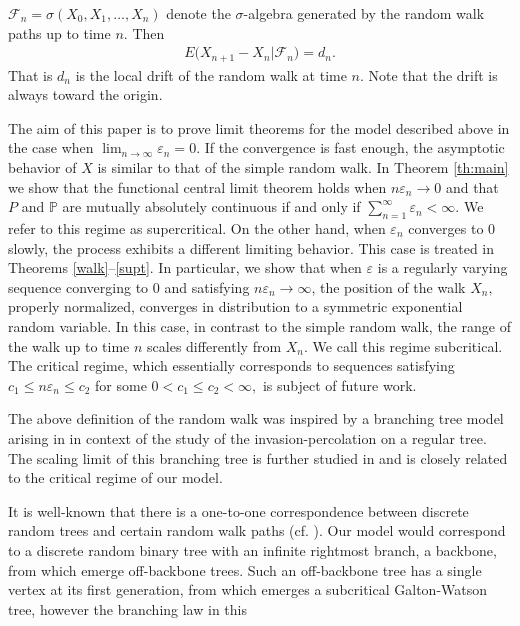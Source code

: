 \documentclass[12pt]{amsart}
\begin{document}
${{\mathcal F}}_n=\sigma(X_0,X_1,\dots,X_n)$ denote the $\sigma$-algebra
generated by the random walk paths up to time $n$. Then \begin{eqnarray}
\label{din_dyn} E \bigl( X_{n+1}-X_n | {{\mathcal F}}_n \bigr) = d_n. \end{eqnarray}
That is $d_n$ is the local drift of the random walk at time $n.$
Note that the drift is always toward the origin.
\par
The aim of this paper is to prove limit theorems for the model
described above in the case when $\lim_{n\to\infty}{\varepsilon}_n=0$. If
the convergence is fast enough, the asymptotic behavior of $X$ is
similar to that of the simple random walk. In Theorem \ref{th:main}
we show that the functional central limit theorem holds when $n
{\varepsilon}_n \to 0$ and that $P$ and ${{\mathbb P}}$ are mutually absolutely
continuous if and only if $\sum_{n=1}^{\infty} {\varepsilon}_n <\infty$. We
refer to this regime as supercritical. On the other hand, when
${\varepsilon}_n$ converges to $0$ slowly, the process exhibits a different
limiting behavior. This case is treated in Theorems
\ref{walk}--\ref{supt}. In particular, we show that when ${\varepsilon}$ is
a regularly varying sequence converging to $0$ and satisfying $n
{\varepsilon}_n \to\infty$, the position of the walk $X_n,$ properly
normalized, converges in distribution to a symmetric exponential
random variable. In this case, in contrast to the simple random
walk, the range of the walk up to time $n$ scales differently from
$X_n$. We call this regime subcritical. The critical regime, which
essentially corresponds to sequences satisfying $c_1 \le n {\varepsilon}_n
\le c_2$ for some $0<c_1\le c_2 <\infty,$ is subject of future work.
\par
The above definition of the random walk was inspired by a branching
tree model arising in \cite{iperc} in context of the study of the
invasion-percolation on a regular tree. The scaling limit of this
branching tree is further studied in \cite{newp} and is closely
related to the critical regime of our model.
\par
It is well-known that there is a one-to-one correspondence between
discrete random trees and certain random walk paths (cf. \cite{LeGall}). 
Our model would correspond to a discrete random
binary tree with an infinite rightmost branch, a backbone, from
which emerge off-backbone trees. Such an off-backbone tree has a
single vertex at its first generation, from which emerges a
subcritical Galton-Watson tree, however the branching law in this
\end{document}
